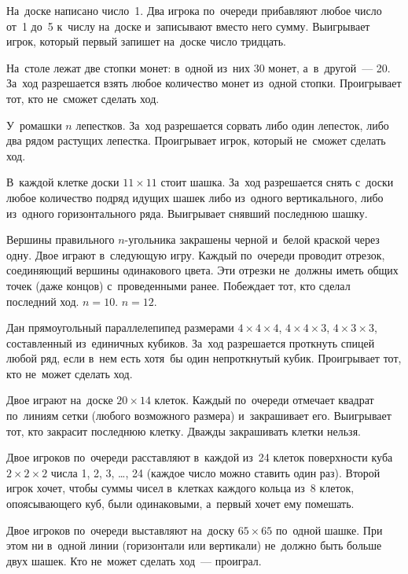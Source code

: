 \begin{problems}

\item
На~доске написано число~1.
Два игрока по~очереди прибавляют любое число от~1 до~5 к~числу на~доске
и~записывают вместо него сумму.
Выигрывает игрок, который первый запишет на~доске число тридцать.

\item
На~столе лежат две стопки монет: в~одной из~них 30 монет, а~в~другой~--- 20.
За~ход разрешается взять любое количество монет из~одной стопки.
Проигрывает тот, кто не~сможет сделать ход.

\item
У~ромашки $n$ лепестков.
За~ход разрешается сорвать либо один лепесток, либо два рядом растущих
лепестка.
Проигрывает игрок, который не~сможет сделать ход.

\item
В~каждой клетке доски $11 \times 11$ стоит шашка.
За~ход разрешается снять с~доски любое количество подряд идущих шашек либо
из~одного вертикального, либо из~одного горизонтального ряда.
Выигрывает снявший последнюю шашку.

\item
Вершины правильного $n$-угольника закрашены черной и~белой краской через одну.
Двое играют в~следующую игру.
Каждый по~очереди проводит отрезок, соединяющий вершины одинакового цвета.
Эти отрезки не~должны иметь общих точек (даже концов) с~проведенными ранее.
Побеждает тот, кто сделал последний ход.
\qquad
\sbp $n = 10$.
\qquad
\sbp $n = 12$.
   
\item
Дан прямоугольный параллелепипед размерами
\quad
\sbp $4 \times 4 \times 4$,
\quad
\sbp $4 \times 4 \times 3$,
\quad
\sbp $4 \times 3 \times 3$,
\quad
составленный из~единичных кубиков.
За~ход разрешается проткнуть спицей любой ряд, если в~нем есть хотя~бы один
непроткнутый кубик.
Проигрывает тот, кто не~может сделать ход.

\item
Двое играют на~доске $20 \times 14$ клеток.
Каждый по~очереди отмечает квадрат по~линиям сетки (любого возможного размера)
и~закрашивает его.
Выигрывает тот, кто закрасит последнюю клетку.
Дважды закрашивать клетки нельзя.

\item
Двое игроков по~очереди расставляют в~каждой из~24 клеток поверхности куба
$2 \times 2 \times 2 $ числа 1, 2, 3, \ldots, 24
(каждое число можно ставить один раз).
Второй игрок хочет, чтобы суммы чисел в~клетках каждого кольца из~8 клеток,
опоясывающего куб, были одинаковыми, а~первый хочет ему помешать.

\item
Двое игроков по~очереди выставляют на~доску $65 \times 65$ по~одной шашке.
При этом ни в~одной линии (горизонтали или вертикали) не~должно быть больше
двух шашек.
Кто не~может сделать ход~--- проиграл.

\end{problems}


